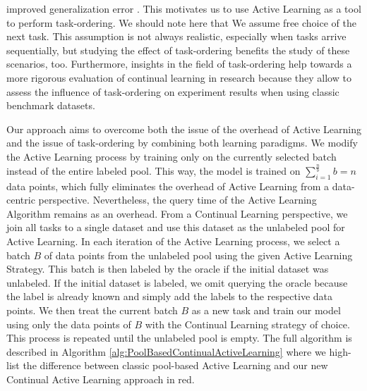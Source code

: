 improved generalization error \cite{hacohen2019power}. This motivates us to use Active Learning as a tool to perform task-ordering. We should note here that We
assume free choice of the next task. This assumption is not always realistic, especially when tasks arrive sequentially, but studying the effect of task-ordering
benefits the study of these scenarios, too. Furthermore, insights in the field of task-ordering help towards a more rigorous evaluation of continual learning in 
research because they allow to assess the influence of task-ordering on experiment results when using classic benchmark datasets. \par
Our approach aims to overcome both the issue of the overhead of Active Learning and the issue of task-ordering by combining both learning paradigms. We modify the Active
Learning process by training only on the currently selected batch instead of the entire labeled pool. This way, the model is trained on $\sum_{i=1}^{\frac{n}{b}} b = n$ 
data points, which fully eliminates the overhead of Active Learning from a data-centric perspective. Nevertheless, the query time of the Active Learning Algorithm remains
as an overhead. From a Continual Learning perspective, we join all tasks to a single dataset and use this dataset as the unlabeled pool for Active Learning. In each iteration
of the Active Learning process, we select a batch $B$ of data points from the unlabeled pool using the given Active Learning Strategy. This batch is then labeled by the
oracle if the initial dataset was unlabeled. If the initial dataset is labeled, we omit querying the oracle because the label is already known and simply add the labels
to the respective data points. We then treat the current batch $B$ as a new task and train our model using only the data points of $B$ with the Continual Learning strategy of
choice. This process is repeated until the unlabeled pool is empty. The full algorithm is described in Algorithm \ref{alg:PoolBasedContinualActiveLearning} where we high-
list the difference between classic pool-based Active Learning and our new Continual Active Learning approach in red. \par

